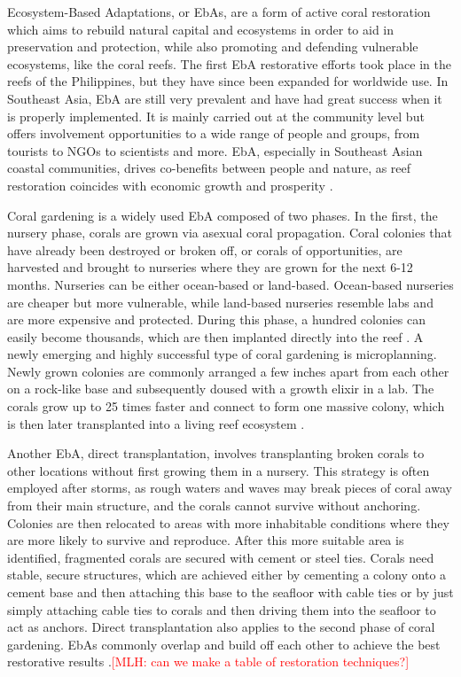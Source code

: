 \documentclass{book}\usepackage{knitr}
\newcommand{\red}[1]{\textcolor{red}{[MLH: #1]}}
\begin{document}
\begin{knitrout}
\begin{kframe}
{Ecosystem-Based Adaptations, or EbAs, are a form of active coral restoration which aims to rebuild natural capital and ecosystems in order to aid in preservation and protection, while also promoting and defending vulnerable ecosystems, like the coral reefs. The first EbA restorative efforts took place in the reefs of the Philippines, but they have since been expanded for worldwide use. In Southeast Asia, EbA are still very prevalent and have had great success when it is properly implemented. It is mainly carried out at the community level but offers involvement opportunities to a wide range of people and groups, from tourists to NGOs to scientists and more. EbA, especially in Southeast Asian coastal communities, drives co-benefits between people and nature, as reef restoration coincides with economic growth and prosperity \citep{14551496520201201}.

Coral gardening is a widely used EbA composed of two phases. In the first, the nursery phase, corals are grown via asexual coral propagation. Coral colonies that have already been destroyed or broken off, or corals of opportunities, are harvested and brought to nurseries where they are grown for the next 6-12 months. Nurseries can be either ocean-based or land-based. Ocean-based nurseries are cheaper but more vulnerable, while land-based nurseries resemble labs and are more expensive and protected.  During this phase, a hundred colonies can easily become thousands, which are then implanted directly into the reef \citep{cgarden}. A newly emerging and highly successful type of coral gardening is microplanning. Newly grown colonies are commonly arranged a few inches apart from each other on a rock-like base and subsequently doused with a growth elixir in a lab. The corals grow up to 25 times faster and connect to form one massive colony, which is then later transplanted into a living reef ecosystem \citep{Morin_2014}.

Another EbA, direct transplantation, involves transplanting broken corals to other locations without first growing them in a nursery. This strategy is often employed after storms, as rough waters and waves may break pieces of coral away from their main structure, and the corals cannot survive without anchoring. Colonies are then relocated to areas with more inhabitable conditions where they are more likely to survive and reproduce. After this more suitable area is identified, fragmented corals are secured with cement or steel ties. Corals need stable, secure structures, which are achieved either by cementing a colony onto a cement base and then attaching this base to the seafloor with cable ties or by just simply attaching cable ties to corals and then driving them into the seafloor to act as anchors. Direct transplantation also applies to the second phase of coral gardening. EbAs commonly overlap and build off each other to achieve the best restorative results \citep{areef}.\red{can we make a table of restoration techniques?}

}
\end{kframe}
\end{knitrout}
\end{document}
